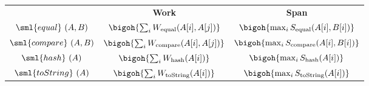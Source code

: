 \begin{costspec}[MkSeqElt]
\label{cost:sequence}
\begin{tabular}{c|c|c}
& \textbf{Work} & \textbf{Span} \\
$\sml{equal}~(A,B)$ & $\bigoh{\sum_i W_{\text{equal}}(A[i], A[j])}$ & $\bigoh {\max_i S_{\text{equal}} (A[i], B[i])}$ \\
$\sml{compare}~(A,B)$ & $\bigoh{\sum_i W_{\text{compare}}(A[i], A[j])}$ & $\bigoh {\max_i S_{\text{compare}} (A[i], B[i])}$ \\
$\sml{hash}~(A)$ & $\bigoh{\sum_i W_{\text{hash}}(A[i])}$ & $\bigoh {\max_i S_{\text{hash}} (A[i])}$ \\
$\sml{toString}~(A)$ & $\bigoh{\sum_i W_{\text{toString}}(A[i])}$ & $\bigoh {\max_i S_{\text{toString}} (A[i])}$ \\
\end{tabular}
\end{costspec}
        